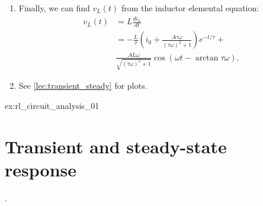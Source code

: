 \documentclass[electronics.tex]{subfiles}
\begin{document}
{\begin{enumerate}
\begin{enumerate}
\begin{enumerate}
				\end{enumerate}
		\end{enumerate}
	\item Finally, we can find $v_L(t)$ from the inductor elemental equation:
		\begin{align*}
			v_L(t) &=
			L \frac{d i_L}{d t} \\
			&= -\frac{L}{\tau}
			\left(
				i_0 +
				\frac{A \tau\omega}{(\tau\omega)^2+1}
			\right)
			e^{-t/\tau} + \\
			&\frac{AL\omega}{\sqrt{(\tau\omega)^2+1}}  
				\cos(\omega t - \arctan \tau\omega).
		\end{align*}
	\item See \autoref{lec:transient_steady} for plots.
	\end{enumerate}
}{%
ex:rl_circuit_analysis_01%
}

\section{Transient and steady-state response}
\tags{}
\label{lec:transient_steady}.




\begin{exercises}

\end{exercises}
\end{document}
